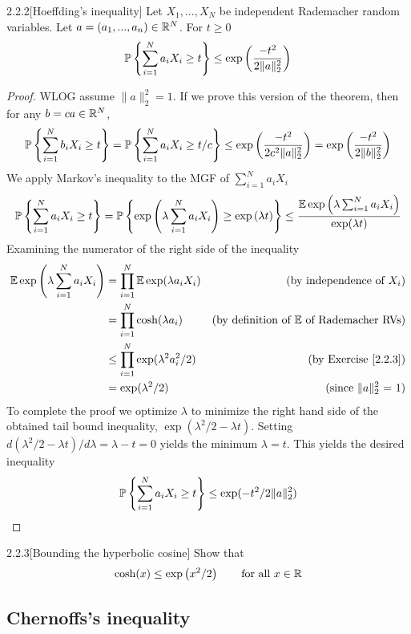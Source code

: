 \begin{thm}{2.2.2}[Hoeffding's inequality] \label{2.2.2}
Let $X_1,...,X_N$ be independent Rademacher random variables. Let $a = (a_1,...,a_n) \in \mathbb{R}^N$. For $t\geq 0$
\begin{align*}
\mathbb{P} \left\{\sum_{i=1}^N a_i X_i \geq t\right\} \leq \exp\left( \frac {-t^2}{2\|a\|^2_2}\right)
\end{align*}
\end{thm}
\begin{proof}
WLOG assume $\|a\|_2^2 = 1$. If we prove this version of the theorem, then for any $b = ca \in \mathbb{R}^N$,
\begin{align*}
    \mathbb{P} \left\{\sum_{i=1}^N b_i X_i \geq t\right\} = \mathbb{P} \left\{\sum_{i=1}^N a_i X_i \geq t/c\right\} \leq \exp\left( \frac {-t^2}{2c^2\|a\|^2_2}\right) = \exp\left( \frac {-t^2}{2\|b\|^2_2}\right)
\end{align*}
We apply Markov's inequality to the MGF of $\sum_{i=1}^N a_iX_i$
\begin{align*}
    \mathbb{P} \left\{\sum_{i=1}^N a_i X_i \geq t\right\} = \mathbb{P} \left\{\exp\left(\lambda\sum_{i=1}^N a_i X_i\right) \geq \exp\left(\lambda t\right)\right\} \leq \frac {\mathbb{E} \exp\left(\lambda\sum_{i=1}^N a_i X_i \right)} {\exp(\lambda t)}
\end{align*}
Examining the numerator of the right side of the inequality
\begin{align*}
    \mathbb{E} \exp\left(\lambda\sum_{i=1}^N a_i X_i \right) &= \prod_{i=1}^N\mathbb{E} \exp(\lambda a_iX_i) &\text{(by independence of $X_i$)}\\
    &= \prod_{i=1}^N \cosh(\lambda a_i) &\text{(by definition of $\mathbb{E}$ of Rademacher RVs)}\\
    &\leq \prod_{i=1}^N \exp(\lambda^2 a_i^2/2) &\text{(by Exercise \ref{2.2.3})}\\
    &= \exp(\lambda^2/2) &\text{(since $\|a\|_2^2$ = 1)}
\end{align*}
To complete the proof we optimize $\lambda$ to minimize the right hand side of the obtained tail bound inequality, $\exp(\lambda^2/2 - \lambda t)$.
Setting $d(\lambda^2/2 - \lambda t)/d\lambda = \lambda - t = 0$ yields the minimum $\lambda = t$. This yields the desired inequality
\begin{align*}
    \mathbb{P} \left\{\sum_{i=1}^N a_i X_i \geq t\right\} \leq \exp(-t^2/2\|a\|_2^2)
\end{align*} 
\end{proof}

\begin{ex}{2.2.3}[Bounding the hyperbolic cosine]\label{2.2.3}
Show that
\begin{align*} 
    \cosh(x) \leq \exp\left(x^2/2\right) \qquad\text{for all $x\in \mathbb{R}$}
\end{align*}
\end{ex}

\subsection{Chernoffs's inequality}


